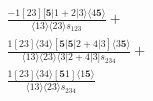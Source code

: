 \documentclass[varwidth, border=5pt]{standalone}
\begin{document}
\begin{my}
$\begin{gathered}
\scriptscriptstyle\frac{-1[23][𝟓|1+2|3⟩⟨4𝟓⟩}{⟨13⟩⟨23⟩s_{123}} +\\
\scriptscriptstyle\frac{1[23]⟨34⟩[𝟓|𝟓|2+4|3]⟨3𝟓⟩}{⟨13⟩⟨23⟩⟨3|2+4|3]s_{234}} +\\
\scriptscriptstyle\frac{1[23]⟨34⟩[𝟓1]⟨1𝟓⟩}{⟨13⟩⟨23⟩s_{234}} \phantom{+}
\end{gathered}$
\end{my}
\end{document}
